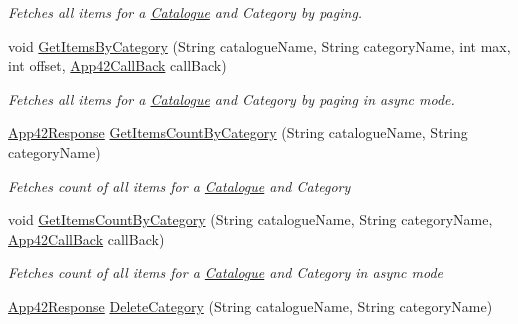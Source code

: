 \begin{DoxyCompactItemize}
\begin{DoxyCompactList}\small\item\em Fetches all items for a \hyperlink{classcom_1_1shephertz_1_1app42_1_1paas_1_1sdk_1_1csharp_1_1shopping_1_1_catalogue}{Catalogue} and Category by paging. \end{DoxyCompactList}\item 
void \hyperlink{classcom_1_1shephertz_1_1app42_1_1paas_1_1sdk_1_1csharp_1_1shopping_1_1_catalogue_service_ad1aa4c44074b7f838daba65c92933d5e}{Get\+Items\+By\+Category} (String catalogue\+Name, String category\+Name, int max, int offset, \hyperlink{interfacecom_1_1shephertz_1_1app42_1_1paas_1_1sdk_1_1csharp_1_1_app42_call_back}{App42\+Call\+Back} call\+Back)
\begin{DoxyCompactList}\small\item\em Fetches all items for a \hyperlink{classcom_1_1shephertz_1_1app42_1_1paas_1_1sdk_1_1csharp_1_1shopping_1_1_catalogue}{Catalogue} and Category by paging in async mode. \end{DoxyCompactList}\item 
\hyperlink{classcom_1_1shephertz_1_1app42_1_1paas_1_1sdk_1_1csharp_1_1_app42_response}{App42\+Response} \hyperlink{classcom_1_1shephertz_1_1app42_1_1paas_1_1sdk_1_1csharp_1_1shopping_1_1_catalogue_service_aef73d5abbeb0e096266f49cae746a169}{Get\+Items\+Count\+By\+Category} (String catalogue\+Name, String category\+Name)
\begin{DoxyCompactList}\small\item\em Fetches count of all items for a \hyperlink{classcom_1_1shephertz_1_1app42_1_1paas_1_1sdk_1_1csharp_1_1shopping_1_1_catalogue}{Catalogue} and Category \end{DoxyCompactList}\item 
void \hyperlink{classcom_1_1shephertz_1_1app42_1_1paas_1_1sdk_1_1csharp_1_1shopping_1_1_catalogue_service_a9207e2d8ee68ae749e0f2f51d079bd26}{Get\+Items\+Count\+By\+Category} (String catalogue\+Name, String category\+Name, \hyperlink{interfacecom_1_1shephertz_1_1app42_1_1paas_1_1sdk_1_1csharp_1_1_app42_call_back}{App42\+Call\+Back} call\+Back)
\begin{DoxyCompactList}\small\item\em Fetches count of all items for a \hyperlink{classcom_1_1shephertz_1_1app42_1_1paas_1_1sdk_1_1csharp_1_1shopping_1_1_catalogue}{Catalogue} and Category in async mode \end{DoxyCompactList}\item 
\hyperlink{classcom_1_1shephertz_1_1app42_1_1paas_1_1sdk_1_1csharp_1_1_app42_response}{App42\+Response} \hyperlink{classcom_1_1shephertz_1_1app42_1_1paas_1_1sdk_1_1csharp_1_1shopping_1_1_catalogue_service_a18401bed343abdafab566ca92cef5d71}{Delete\+Category} (String catalogue\+Name, String category\+Name)

\end{DoxyCompactItemize}
